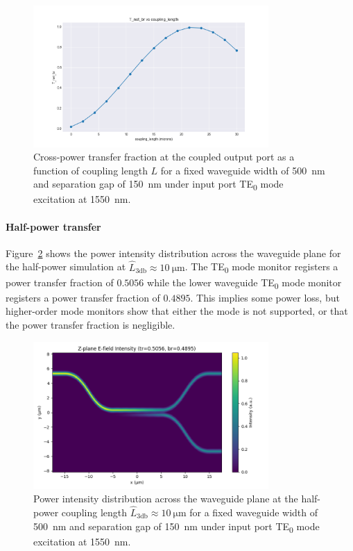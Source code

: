 \documentclass[10pt, a4paper]{article}
\begin{document}
\begin{figure}[h!]
  \centering
  \includegraphics[width=0.8\textwidth]{task3/sweep_plots/sweep_idx_0_sweep__coupling_length=0_30_15_T_net_br_line.png}
  \caption{Cross-power transfer fraction at the coupled output port as a function of coupling length \(L\) for a fixed waveguide width of \SI{500}{\nm} and separation gap of \SI{150}{\nm} under input port TE\textsubscript{0} mode excitation at \SI{1550}{\nm}.}
  \label{fig:coupling_length}
\end{figure}


\paragraph{Half-power transfer}
Figure~\ref{fig:eq_power_distribution} shows the power intensity distribution across the waveguide plane
for the half-power simulation at \(\hat{L}_{3\text{db}}\approx\SI{10}{\um}\).
The TE\textsubscript{0} mode monitor registers a power transfer fraction of
\(0.5056\) while the lower waveguide TE\textsubscript{0} mode monitor registers a power transfer fraction of
\(0.4895\). This implies some power loss, but higher-order mode monitors
show that either the mode is not supported, or that the power transfer fraction is negligible.

\begin{figure}[h!]
  \centering
  \includegraphics[width=0.8\textwidth]{task3/sim_1742_110625/z_plane_intensity.png}
  \caption{Power intensity distribution across the waveguide plane at the half-power coupling length \(\hat{L}_{3\text{db}}\approx\SI{10}{\um}\) for a fixed waveguide width of \SI{500}{\nm} and separation gap of \SI{150}{\nm} under input port TE\textsubscript{0} mode excitation at \SI{1550}{\nm}.}
  \label{fig:eq_power_distribution}
\end{figure}
\end{document}
